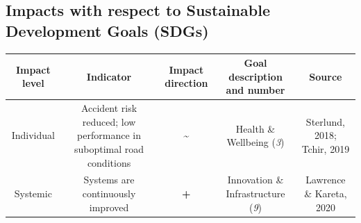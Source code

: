 \documentclass[
]{book}
\begin{document}
\hypertarget{impacts-with-respect-to-sustainable-development-goals-sdgs-25}{%
\subsection*{Impacts with respect to Sustainable Development Goals (SDGs)}\label{impacts-with-respect-to-sustainable-development-goals-sdgs-25}}

\begin{longtable}[]{@{}ccccc@{}}
\toprule
\begin{minipage}[b]{0.17\columnwidth}\centering
Impact level\strut
\end{minipage} & \begin{minipage}[b]{0.16\columnwidth}\centering
Indicator\strut
\end{minipage} & \begin{minipage}[b]{0.17\columnwidth}\centering
Impact direction\strut
\end{minipage} & \begin{minipage}[b]{0.17\columnwidth}\centering
Goal description and number\strut
\end{minipage} & \begin{minipage}[b]{0.17\columnwidth}\centering
Source\strut
\end{minipage}\tabularnewline
\midrule
\endhead
\begin{minipage}[t]{0.17\columnwidth}\centering
Individual\strut
\end{minipage} & \begin{minipage}[t]{0.16\columnwidth}\centering
Accident risk reduced; low performance in suboptimal road conditions\strut
\end{minipage} & \begin{minipage}[t]{0.17\columnwidth}\centering
\textbf{\textasciitilde{}}\strut
\end{minipage} & \begin{minipage}[t]{0.17\columnwidth}\centering
Health \& Wellbeing (\emph{3})\strut
\end{minipage} & \begin{minipage}[t]{0.17\columnwidth}\centering
Sterlund, 2018; Tchir, 2019\strut
\end{minipage}\tabularnewline
\begin{minipage}[t]{0.17\columnwidth}\centering
Systemic\strut
\end{minipage} & \begin{minipage}[t]{0.16\columnwidth}\centering
Systems are continuously improved\strut
\end{minipage} & \begin{minipage}[t]{0.17\columnwidth}\centering
\textbf{+}\strut
\end{minipage} & \begin{minipage}[t]{0.17\columnwidth}\centering
Innovation \& Infrastructure (\emph{9})\strut
\end{minipage} & \begin{minipage}[t]{0.17\columnwidth}\centering
Lawrence \& Kareta, 2020\strut
\end{minipage}\tabularnewline
\bottomrule
\end{longtable}
\end{document}
